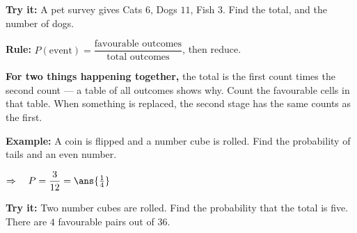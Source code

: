 \documentclass[12pt]{article}
\begin{document}
\begin{tryitbox}
\textbf{Try it:} \quad A pet survey gives Cats $6$, Dogs $11$, Fish $3$. Find the total,
and the number of dogs.\\[2pt]
\end{tryitbox}


\begin{formulabox}
\textbf{Rule:} $P(\text{event}) = \dfrac{\text{favourable outcomes}}{\text{total
outcomes}}$, then reduce.
\par\smallskip
\textbf{For two things happening together,} the total is the first count times the second
count --- a table of all outcomes shows why. Count the favourable cells in that table.
When something is replaced, the second stage has the same counts as the first.
\end{formulabox}

\begin{examplebox}
\textbf{Example:} \quad A coin is flipped and a number cube is rolled. Find the
probability of tails and an even number.

$\Rightarrow\quad P = \dfrac{3}{12} = \ans{\tfrac{1}{4}}$
\end{examplebox}

\begin{tryitbox}
\textbf{Try it:} \quad Two number cubes are rolled. Find the probability that the total
is five. There are $4$ favourable pairs out of $36$.\\[2pt]
\end{tryitbox}
\end{document}
